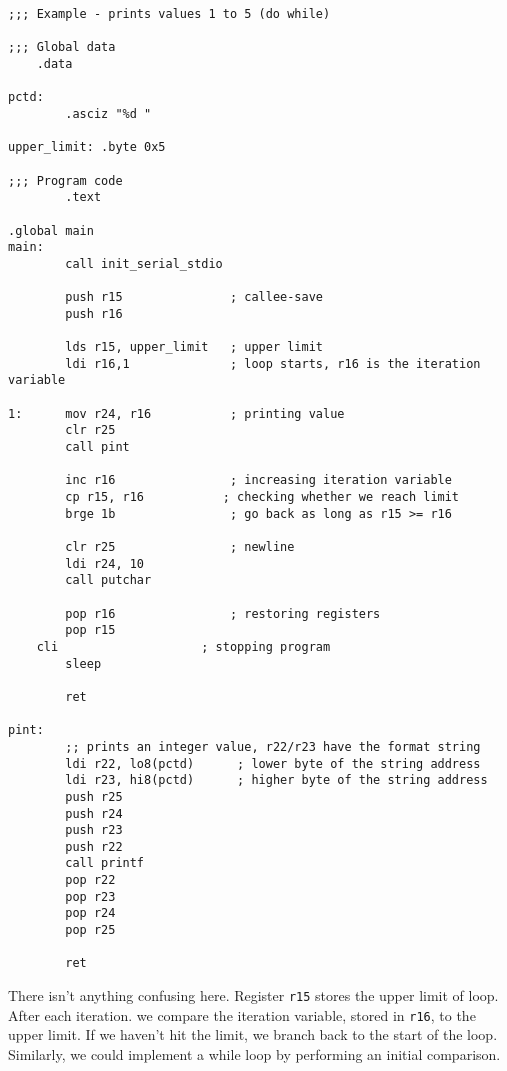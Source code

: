 \begin{lstlisting}
;;; Example - prints values 1 to 5 (do while)

;;; Global data
    .data

pctd:
        .asciz "%d "         

upper_limit: .byte 0x5              

;;; Program code
        .text                 

.global main                  
main:                          
        call init_serial_stdio

        push r15               ; callee-save 
        push r16               

        lds r15, upper_limit   ; upper limit
        ldi r16,1              ; loop starts, r16 is the iteration variable

1:      mov r24, r16           ; printing value
        clr r25                
        call pint

        inc r16                ; increasing iteration variable
        cp r15, r16           ; checking whether we reach limit
        brge 1b                ; go back as long as r15 >= r16

        clr r25                ; newline
        ldi r24, 10            
        call putchar
    
        pop r16                ; restoring registers
        pop r15
    cli                    ; stopping program
        sleep                          

        ret                    

pint:
        ;; prints an integer value, r22/r23 have the format string
        ldi r22, lo8(pctd)      ; lower byte of the string address
        ldi r23, hi8(pctd)      ; higher byte of the string address
        push r25
        push r24
        push r23
        push r22
        call printf
        pop r22
        pop r23
        pop r24
        pop r25

        ret
\end{lstlisting}

There isn't anything confusing here. Register \verb!r15! stores the upper limit of loop. After each iteration. we compare the iteration variable, stored in \verb!r16!, to the upper limit. If we haven't hit the limit, we branch back to the start of the loop. Similarly, we could implement a while loop by performing an initial comparison.